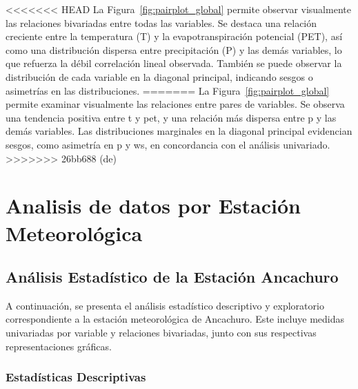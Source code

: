 <<<<<<< HEAD
La Figura~\ref{fig:pairplot_global} permite observar visualmente las relaciones bivariadas entre todas las variables. Se destaca una relación creciente entre la temperatura (T) y la evapotranspiración potencial (PET), así como una distribución dispersa entre precipitación (P) y las demás variables, lo que refuerza la débil correlación lineal observada. También se puede observar la distribución de cada variable en la diagonal principal, indicando sesgos o asimetrías en las distribuciones.
=======
La Figura~\ref{fig:pairplot_global} permite examinar visualmente las relaciones entre pares de variables. Se observa una tendencia positiva entre \gls{t} y \gls{pet}, y una relación más dispersa entre \gls{p} y las demás variables. Las distribuciones marginales en la diagonal principal evidencian sesgos, como asimetría en \gls{p} y \gls{ws}, en concordancia con el análisis univariado.
>>>>>>> 26bb688 (de)



\chapter{Analisis de datos por Estación Meteorológica}

\section{Análisis Estadístico de la Estación Ancachuro}

A continuación, se presenta el análisis estadístico descriptivo y exploratorio correspondiente a la estación meteorológica de Ancachuro. Este incluye medidas univariadas por variable y relaciones bivariadas, junto con sus respectivas representaciones gráficas.

\subsection{Estadísticas Descriptivas}

